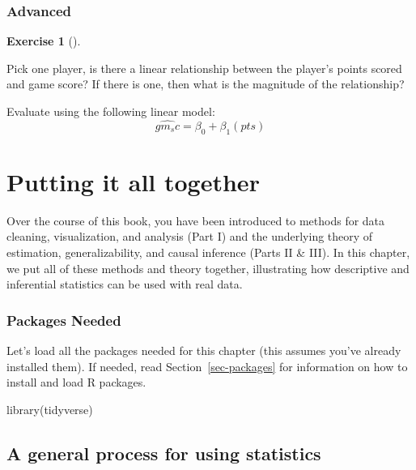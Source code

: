 \documentclass[
  letterpaper,
  DIV=11,
  numbers=noendperiod]{scrreprt}
\newenvironment{Shaded}{\begin{snugshade}}{\end{snugshade}}
\newcommand{\FunctionTok}[1]{\textcolor[rgb]{0.28,0.35,0.67}{#1}}
\newcommand{\NormalTok}[1]{\textcolor[rgb]{0.00,0.23,0.31}{#1}}
\theoremstyle{definition}
\newtheorem{exercise}{Exercise}[chapter]
\theoremstyle{remark}
\begin{document}
\hypertarget{sec-ex12-advanced}{%
\subsection{Advanced}\label{sec-ex12-advanced}}

\begin{exercise}[]\protect\hypertarget{exr-ch12-adv1}{}\label{exr-ch12-adv1}

Pick one player, is there a linear relationship between the player's
points scored and game score? If there is one, then what is the
magnitude of the relationship?

Evaluate using the following linear model:
\[ \widehat{gm_sc} = \beta_0 + \beta_1(pts)\]

\end{exercise}

\hypertarget{sec-putting-together}{%
\chapter{Putting it all together}\label{sec-putting-together}}

Over the course of this book, you have been introduced to methods for
data cleaning, visualization, and analysis (Part I) and the underlying
theory of estimation, generalizability, and causal inference (Parts II
\& III). In this chapter, we put all of these methods and theory
together, illustrating how descriptive and inferential statistics can be
used with real data.

\hypertarget{packages-needed-6}{%
\subsection*{Packages Needed}\label{packages-needed-6}}

Let's load all the packages needed for this chapter (this assumes you've
already installed them). If needed, read Section~\ref{sec-packages} for
information on how to install and load R packages.

\begin{Shaded}
\begin{Highlighting}[]
\FunctionTok{library}\NormalTok{(tidyverse)}
\end{Highlighting}
\end{Shaded}

\hypertarget{a-general-process-for-using-statistics}{%
\section{A general process for using
statistics}\label{a-general-process-for-using-statistics}}
\end{document}

